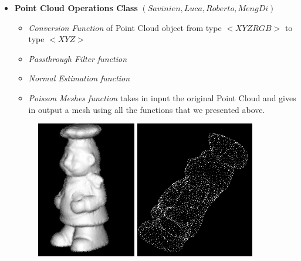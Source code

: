 \documentclass[11pt]{article} %
\begin{document}
\begin{itemize}
	
	\item \textbf{Point Cloud Operations Class} $(Savinien,Luca,Roberto,MengDi)$
		\begin{itemize}
			\item \textit{Conversion Function} of Point Cloud object from type $<XYZRGB>$ to type $<XYZ>$
			\item \textit{Passthrough Filter function}
			\item \textit{Normal Estimation function}
			\item \textit{Poisson Meshes function} takes in input the original Point Cloud and gives in output a mesh using all the functions that we presented above.
		
		
		\end{itemize}

		
			\begin{figure}[H]
				\centering
				\includegraphics[height = 6cm]{PoinOp3.png} 
				\includegraphics[height = 6cm]{PoinOp1.png}	
				
			\end{figure}	
	

\end{itemize}
\end{document}
